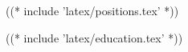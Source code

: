 \documentclass[10pt]{barag_resume}
\begin{document}
    ((* include 'latex/positions.tex' *))

    ((* include 'latex/education.tex' *))
\end{document}
